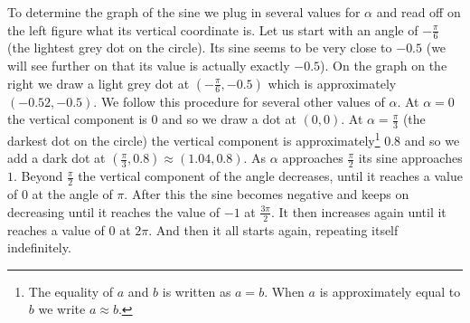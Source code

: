\noindent To determine the graph of the sine we plug in several values for $\alpha$ and read off on the left figure what its vertical coordinate is. Let us start with an angle of $-\frac{\pi}{6}$ (the lightest grey dot on the circle). Its sine seems to be very close to $-0.5$ (we will see further on that its value is actually exactly $-0.5$). On the graph on the right we draw a light grey dot at $\left( -\frac{\pi}{6}, -0.5 \right)$ which is approximately $\left( -0.52, -0.5 \right)$. We follow this procedure for several other values of $\alpha$. At $\alpha=0$ the vertical component is $0$ and so we draw a dot at $\left( 0,0 \right)$. At $\alpha=\frac{\pi}{3}$ (the darkest dot on the circle) the vertical component is approximately\footnote{The equality of $a$ and $b$ is written as $a=b$. When $a$ is approximately equal to $b$ we write $a \approx b$.} $0.8$ and so we add a dark dot at $\left( \frac{\pi}{3}, 0.8 \right) \approx \left( 1.04, 0.8 \right)$. As $\alpha$ approaches $\frac{\pi}{2}$ its sine approaches $1$. Beyond $\frac{\pi}{2}$ the vertical component of the angle decreases, until it reaches a value of $0$ at the angle of $\pi$. After this the sine becomes negative and keeps on decreasing until it reaches the value of $-1$ at $\frac{3 \pi}{2}$. It then increases again until it reaches a value of $0$ at $2 \pi$. And then it all starts again, repeating itself indefinitely.
\begin{center}
\end{center}
